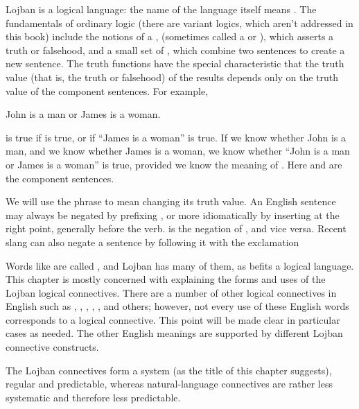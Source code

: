 Lojban is a logical language: the name of the language
    itself means . The fundamentals of ordinary
    logic (there are variant logics, which aren't addressed in this
    book) include the notions of a , (sometimes called
    a  or ), which asserts a truth or
    falsehood, and a small set of , which
    combine two sentences to create a new sentence. The truth
    functions have the special characteristic that the truth value
    (that is, the truth or falsehood) of the results depends only
    on the truth value of the component sentences. For example,
\begin{example}
John is a man or James is a woman.
\end{example}

{\noindent}is true if  is true, or if ``James is a
    woman'' is true. If we know whether John is a man, and we know
    whether James is a woman, we know whether ``John is a man or
    James is a woman'' is true, provided we know the meaning of
    . Here  and  are the
    component sentences. 

We will use the phrase  to mean
    changing its truth value. An English sentence may always be
    negated by prefixing , or more
    idiomatically by inserting  at the right point,
    generally before the verb.  is the
    negation of , and vice versa. Recent slang
    can also negate a sentence by following it with the exclamation

Words like  are called , and
    Lojban has many of them, as befits a logical language. This
    chapter is mostly concerned with explaining the forms and uses
    of the Lojban logical connectives. There are a number of other
    logical connectives in English such as , ,
    , , , and others; however,
    not every use of these English words corresponds to a logical
    connective. This point will be made clear in particular cases
    as needed. The other English meanings are supported by
    different Lojban connective constructs.

The Lojban connectives form a system (as the title of this
    chapter suggests), regular and predictable, whereas
    natural-language connectives are rather less systematic and
    therefore less predictable.

